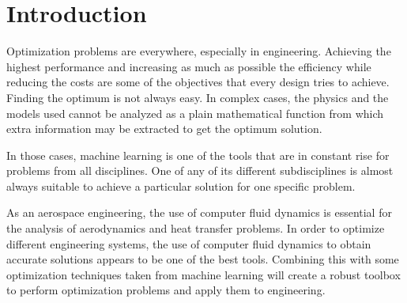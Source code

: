 \chapter{Introduction}

Optimization problems are everywhere, especially in engineering. Achieving the highest performance and increasing as much as possible the efficiency while reducing the costs are some of the objectives that every design tries to achieve. Finding the optimum is not always easy. In complex cases, the physics and the models used cannot be analyzed as a plain mathematical function from which extra information may be extracted to get the optimum solution. 

In those cases, machine learning is one of the tools that are in constant rise for problems from all disciplines. One of any of its different subdisciplines is almost always suitable to achieve a particular solution for one specific problem. 

As an aerospace engineering, the use of computer fluid dynamics is essential for the analysis of aerodynamics and heat transfer problems. In order to optimize different engineering systems, the use of computer fluid dynamics to obtain accurate solutions appears to be one of the best tools. Combining this with some optimization techniques taken from machine learning will create a robust toolbox to perform optimization problems and apply them to engineering. 